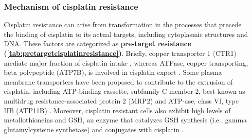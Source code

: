 \subsubsection{Mechanism of cisplatin resistance}
Cisplatin resistance can arise from transformation in the processes that precede the binding of cisplatin to its actual targets, including cytoplasmic structures and DNA. These factors are categorized as \textbf{pre-target resistance} \textbf{(\autoref{tab:pretargetcisplatinresistance})}. Briefly, copper transporter 1 (CTR1) mediate major fraction of cisplatin intake \cite{more2010role,ishida2010enhancing, holzer2006contribution}, whereas ATPase, copper transporting, beta polypeptide (ATP7B), is involved in cisplatin export \cite{katano2002acquisition,komatsu2000copper, aida2005expression}. Some plasma membrane transporters have been proposed to contribute to the extrusion of cisplatin, including ATP-binding cassette, subfamily C member 2, best known as multidrug  resistance-associated protein 2 (MRP2) \cite {cui1999drug,korita2010multidrug,liedert2003overexpression} and ATP-ase, class VI, type IIB (ATP11B) \cite{moreno2013atp11b}. Moreover, cisplatin resistant cells also exhibit high levels of metallothioneins \cite{kelley1988overexpression,kasahara1991metallothionein} and GSH, an enzyme that catalyzes GSH synthesis (i.e., gamma glutamylcysteine synthetase) and conjugates with cisplatin \cite{lewis1988glutathione,chen2010role}. 

